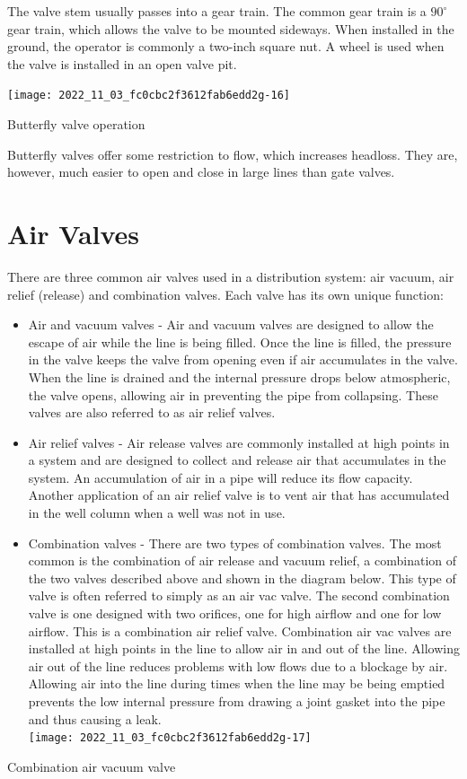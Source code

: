 \documentclass[10pt]{article}
\begin{document}
The valve stem usually passes into a gear train. The common gear train is a $90^{\circ}$ gear train, which allows the valve to be mounted sideways. When installed in the ground, the operator is commonly a two-inch square nut. A wheel is used when the valve is installed in an open valve pit.

\texttt{[image: 2022\_11\_03\_fc0cbc2f3612fab6edd2g-16]}

Butterfly valve operation

Butterfly valves offer some restriction to flow, which increases headloss. They are, however, much easier to open and close in large lines than gate valves.

\section{Air Valves}
There are three common air valves used in a distribution system: air vacuum, air relief (release) and combination valves. Each valve has its own unique function:

\begin{itemize}
  \item Air and vacuum valves - Air and vacuum valves are designed to allow the escape of air while the line is being filled. Once the line is filled, the pressure in the valve keeps the valve from opening even if air accumulates in the valve. When the line is drained and the internal pressure drops below atmospheric, the valve opens, allowing air in preventing the pipe from collapsing. These valves are also referred to as air relief valves.

  \item Air relief valves - Air release valves are commonly installed at high points in a system and are designed to collect and release air that accumulates in the system. An accumulation of air in a pipe will reduce its flow capacity. Another application of an air relief valve is to vent air that has accumulated in the well column when a well was not in use.

  \item Combination valves - There are two types of combination valves. The most common is the combination of air release and vacuum relief, a combination of the two valves described above and shown in the diagram below. This type of valve is often referred to simply as an air vac valve. The second combination valve is one designed with two orifices, one for high airflow and one for low airflow. This is a combination air relief valve. Combination air vac valves are installed at high points in the line to allow air in and out of the line. Allowing air out of the line reduces problems with low flows due to a blockage by air. Allowing air into the line during times when the line may be being emptied prevents the low internal pressure from drawing a joint gasket into the pipe and thus causing a leak.\\

\texttt{[image: 2022\_11\_03\_fc0cbc2f3612fab6edd2g-17]}

\end{itemize}
Combination air vacuum valve
\end{document}
